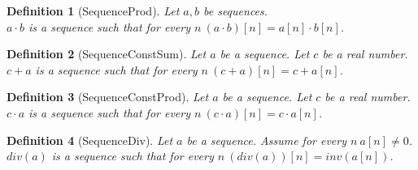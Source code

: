 \documentclass{article}
\newenvironment{forthel}{\begin{leftbar}}{\end{leftbar}}
\newtheorem{definition}{Definition}
\newcommand{\cdotone}{\cdot}
\newcommand{\cdottwo}{\cdot}
\newcommand{\plustwo}{+}
\begin{document}
\begin{forthel}
	\begin{definition}[SequenceProd]
	Let $a,b$ be sequences. \\$a \cdotone b$ is a sequence such that for every $n \ (a \cdotone b)[n] = a[n] \cdot b[n]$.
	\end{definition}
	
	\begin{definition}[SequenceConstSum]
	Let $a$ be a sequence. Let $c$ be a real number. $c \plustwo a$ is a sequence such that for every $n \ (c \plustwo a)[n] = c + a[n]$.
	\end{definition}
	
	\begin{definition}[SequenceConstProd]
	Let $a$ be a sequence. Let $c$ be a real number. $c \cdottwo a$ is a sequence such that for every $n \ (c \cdottwo a)[n] = c \cdot a[n]$.
	\end{definition}

	\begin{definition}[SequenceDiv]
	Let $a$ be a sequence. Assume for every $n \ a[n] \neq 0$. $div(a)$ is a sequence such that for every $n \ (div(a))[n] = inv(a[n])$.
	\end{definition}
	

\end{forthel}
\end{document}
